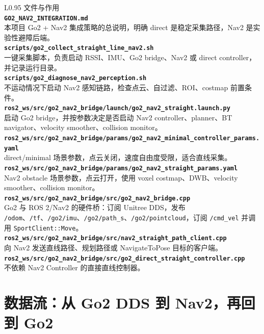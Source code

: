 \documentclass[UTF8,11pt,a4paper,openany]{ctexrep}
\newcommand{\code}[1]{\nolinkurl{#1}}
\newcommand{\topic}[1]{\nolinkurl{#1}}
\newcommand{\file}[1]{\nolinkurl{#1}}
\begin{document}
\begin{longtable}{L{0.95\textwidth}}
\toprule
文件与作用 \\
\midrule
\textbf{\file{GO2_NAV2_INTEGRATION.md}}\\
本项目 Go2 + Nav2 集成策略的总说明，明确 direct 是稳定采集路径，Nav2 是实验性避障后端。 \\[0.35em]
\textbf{\file{scripts/go2_collect_straight_line_nav2.sh}}\\
一键采集脚本，负责启动 RSSI、IMU、Go2 bridge、Nav2 或 direct controller，并记录运行目录。 \\[0.35em]
\textbf{\file{scripts/go2_diagnose_nav2_perception.sh}}\\
不运动情况下启动 Nav2 感知链路，检查点云、自过滤、ROI、costmap 前置条件。 \\[0.35em]
\textbf{\file{ros2_ws/src/go2_nav2_bridge/launch/go2_nav2_straight.launch.py}}\\
启动 Go2 bridge，并按参数决定是否启动 Nav2 controller、planner、BT navigator、velocity smoother、collision monitor。 \\[0.35em]
\textbf{\file{ros2_ws/src/go2_nav2_bridge/params/go2_nav2_minimal_controller_params.yaml}}\\
direct/minimal 场景参数，点云关闭，速度自由度受限，适合直线采集。 \\[0.35em]
\textbf{\file{ros2_ws/src/go2_nav2_bridge/params/go2_nav2_straight_params.yaml}}\\
Nav2 obstacle 场景参数，点云打开，使用 voxel costmap、DWB、velocity smoother、collision monitor。 \\[0.35em]
\textbf{\file{ros2_ws/src/go2_nav2_bridge/src/go2_nav2_bridge.cpp}}\\
Go2 与 ROS 2/Nav2 的硬件桥：订阅 Unitree DDS，发布 \topic{/odom}、\topic{/tf}、\topic{/go2/imu}、\topic{/go2/path_s}、\topic{/go2/pointcloud}，订阅 \topic{/cmd_vel} 并调用 \code{SportClient::Move}。 \\[0.35em]
\textbf{\file{ros2_ws/src/go2_nav2_bridge/src/nav2_straight_path_client.cpp}}\\
向 Nav2 发送直线路径、规划路径或 NavigateToPose 目标的客户端。 \\[0.35em]
\textbf{\file{ros2_ws/src/go2_nav2_bridge/src/go2_direct_straight_controller.cpp}}\\
不依赖 Nav2 Controller 的直接直线控制器。 \\
\bottomrule
\end{longtable}

\section{数据流：从 Go2 DDS 到 Nav2，再回到 Go2}
\end{document}
